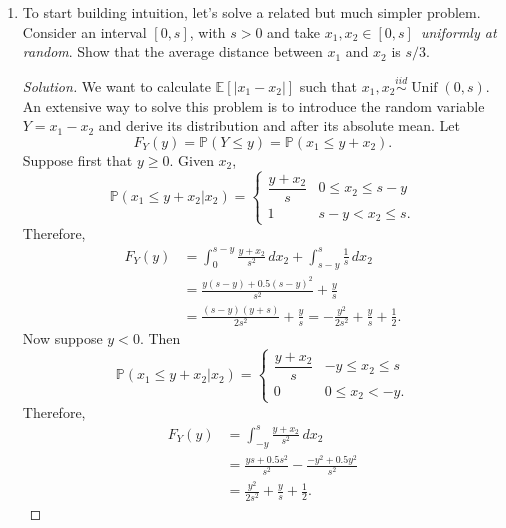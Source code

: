 \documentclass[a4paper,10pt, notitlepage]{report}
\newcommand{\unif}{\operatorname{Unif}}
\newcommand{\ev}{\mathbb{E}}
\newcommand{\pr}{\mathbb{P}}
\begin{document}
\begin{enumerate}
 \item To start building intuition, let's solve a related but much simpler problem.
 Consider an interval $[0, s]$, with $s>0$ and take $x_1,x_2 \in [0, s]$~\textit{uniformly at random}.
 Show that the average distance between $x_1$ and $x_2$ is $s/3$.

 \begin{proof}[Solution]
    We want to calculate $\ev[|x_1 - x_2|]$ such that $x_1, x_2
    \overset{iid}{\sim} \unif(0,s)$. An extensive way to solve this problem is
    to introduce the random variable $Y = x_1 - x_2$ and derive its
    distribution and after its absolute mean. Let
    \begin{equation*}
        F_Y(y) = \pr(Y \le y) = \pr(x_1 \le y + x_2).
    \end{equation*}
    Suppose first that $y \ge 0$. Given
    $x_2$, 
    $$\pr(x_1 \le y + x_2|x_2) = \begin{cases}
        \dfrac{y + x_2}{s} &0 \le x_2 \le s - y \\
        1 &s - y < x_2 \le s.
    \end{cases}$$
    Therefore, 
    \begin{equation*}
        \begin{split}
            F_Y(y) &= \int_0^{s-y} \frac{y+x_2}{s^2} \, dx_2 + \int_{s-y}^s \frac{1}{s} \, dx_2  \\
            &= \frac{y(s-y) + 0.5(s-y)^2}{s^2} + \frac{y}{s} \\
            &= \frac{(s-y)(y + s)}{2s^2} + \frac{y}{s} = - \frac{y^2}{2s^2} + \frac{y}{s} + \frac{1}{2}.
        \end{split}
    \end{equation*}
    Now suppose $y < 0$. Then 
    $$\pr(x_1 \le y + x_2|x_2) = \begin{cases}
        \dfrac{y + x_2}{s} &-y \le x_2 \le s \\
        0 &0 \le x_2 < -y.
    \end{cases}$$
    Therefore, 
    \begin{equation*}
        \begin{split}
            F_Y(y) &= \int_{-y}^{s} \frac{y+x_2}{s^2} \, dx_2 \\
            &= \frac{ys + 0.5s^2}{s^2} - \frac{-y^2 + 0.5y^2}{s^2} \\
            &= \frac{y^2}{2s^2} + \frac{y}{s} + \frac{1}{2}.
        \end{split}
    \end{equation*}

\end{proof}
\end{enumerate}
\end{document}
